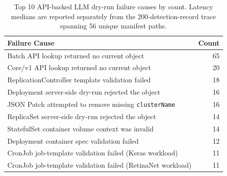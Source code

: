 \begin{table}[!ht]
\centering
\caption{Top 10 API-backed LLM dry-run failure causes by count. Latency medians are reported separately from the 200-detection-record trace spanning 56 unique manifest paths.}
\label{tab:grok_failures}
\begin{tabularx}{\columnwidth}{>{\raggedright\arraybackslash}X r}
\toprule
\textbf{Failure Cause} & \textbf{Count} \\
\midrule
Batch API lookup returned no current object & 65 \\
Core/v1 API lookup returned no current object & 20 \\
ReplicationController template validation failed & 18 \\
Deployment server-side dry-run rejected the object & 16 \\
JSON Patch attempted to remove missing \texttt{clusterName} & 16 \\
ReplicaSet server-side dry-run rejected the object & 14 \\
StatefulSet container volume context was invalid & 14 \\
Deployment container spec validation failed & 12 \\
CronJob job-template validation failed (Keras workload) & 11 \\
CronJob job-template validation failed (RetinaNet workload) & 11 \\
\bottomrule
\end{tabularx}
\end{table}
